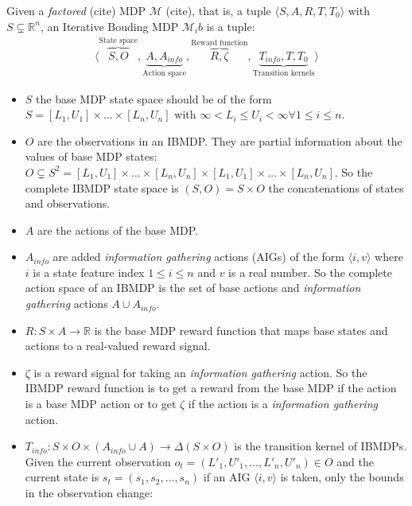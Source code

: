 \begin{definition}
Given a \textit{factored} (cite) MDP $\mathcal{M}$ (cite), that is, a tuple $\langle S, A, R, T, T_0 \rangle$ with $S\subsetneq \mathbb{R}^n$, an Iterative Bouding MDP $\mathcal{M}_ib$ is a tuple:
\begin{align*}
    \langle \overbrace{S, O}^{\text{State space}}, \underbrace{A, A_{info}}_{\text{Action space}}, \overbrace{R, \zeta}^{\text{Reward function}}, \underbrace{T_{info}, T, T_0}_{\text{Transition kernels}}\rangle
\end{align*}

\begin{itemize}
\item $S$ the base MDP state space should be of the form $S = [L_1, U_1]\times \dots \times [L_n, U_n]$ with $\infty < L_i \leq U_i < \infty \forall 1\leq i\leq n$.
\item $O$ are the observations in an IBMDP. They are partial information about the values of base MDP states: $O\subsetneq S^2 =  [L_1, U_1]\times \dots \times [L_n, U_n] \times [L_1, U_1]\times \dots \times [L_n, U_n]$. So the complete IBMDP state space is $(S, O) = S \times O$ the concatenations of states and observations.
\item $A$ are the actions of the base MDP.
\item $A_{info}$ are added \textit{information gathering} actions (AIGs) of the form $\langle i, v \rangle$ where $i$ is a state feature index $1 \leq i \leq n$ and $v$ is a real number. So the complete action space of an IBMDP is the set of base actions and \textit{information gathering} actions $A \cup A_{info}$.
\item $R: S\times A \rightarrow \mathbb{R}$ is the base MDP reward function that maps base states and actions to a real-valued reward signal.
\item $\zeta$ is a reward signal for taking an \textit{information gathering} action. So the IBMDP reward function is to get a reward from the base MDP if the action is a base MDP action or to get $\zeta$ if the action is a \textit{information gathering} action.
\item $T_{info}: S\times O \times( A_{info} \cup A )\rightarrow \Delta (S\times O)$ is the transition kernel of IBMDPs. 
Given the current observation $o_{t} = (L'_1, U'_1, \dots, L'_n, U'_n)\in O$ and the current state is $s_t=(s_1, s_2, \dots, s_n)$ if an AIG $\langle i, v \rangle$ is taken, only the bounds in the observation change:
\begin{align*}

\end{align*}
\end{itemize}
\end{definition}

